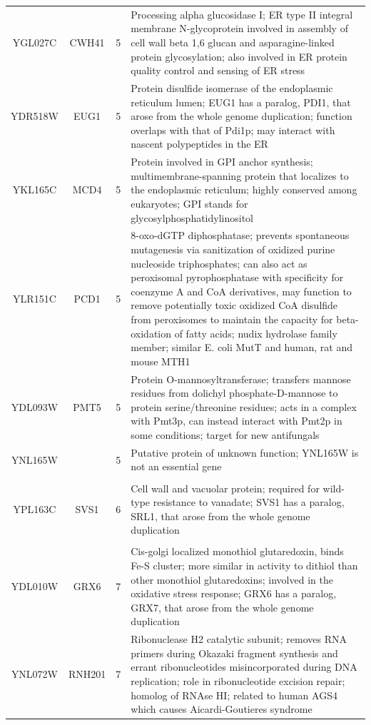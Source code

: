 \documentclass[]{article}
\begin{document}
\begin{longtable}{@{\extracolsep{3pt}} cccp{85mm}}
		YGL027C & CWH41 & 5 & Processing alpha glucosidase I; ER type II integral membrane N-glycoprotein involved in assembly of cell wall beta 1,6 glucan and asparagine-linked protein glycosylation; also involved in ER protein quality control and sensing of ER stress \\ 
		YDR518W & EUG1 & 5 & Protein disulfide isomerase of the endoplasmic reticulum lumen; EUG1 has a paralog, PDI1, that arose from the whole genome duplication; function overlaps with that of Pdi1p; may interact with nascent polypeptides in the ER \\ 
		YKL165C & MCD4 & 5 & Protein involved in GPI anchor synthesis; multimembrane-spanning protein that localizes to the endoplasmic reticulum; highly conserved among eukaryotes; GPI stands for glycosylphosphatidylinositol \\ 
		YLR151C & PCD1 & 5 & 8-oxo-dGTP diphosphatase; prevents spontaneous mutagenesis via sanitization of oxidized purine nucleoside triphosphates; can also act as peroxisomal pyrophosphatase with specificity for coenzyme A and CoA derivatives, may function to remove potentially toxic oxidized CoA disulfide from peroxisomes to maintain the capacity for beta-oxidation of fatty acids; nudix hydrolase family member; similar E. coli MutT and human, rat and mouse MTH1 \\ 
		YDL093W & PMT5 & 5 & Protein O-mannosyltransferase; transfers mannose residues from dolichyl phosphate-D-mannose to protein serine/threonine residues; acts in a complex with Pmt3p, can instead interact with Pmt2p in some conditions; target for new antifungals \\ 
		YNL165W &  & 5 & Putative protein of unknown function; YNL165W is not an essential gene \\ \hline \\[-1.8ex]
		YPL163C & SVS1 & 6 & Cell wall and vacuolar protein; required for wild-type resistance to vanadate; SVS1 has a paralog, SRL1, that arose from the whole genome duplication \\ \hline \\[-1.8ex]
		YDL010W & GRX6 & 7 & Cis-golgi localized monothiol glutaredoxin, binds Fe-S cluster; more similar in activity to dithiol than other monothiol glutaredoxins; involved in the oxidative stress response; GRX6 has a paralog, GRX7, that arose from the whole genome duplication \\ 
		YNL072W & RNH201 & 7 & Ribonuclease H2 catalytic subunit; removes RNA primers during Okazaki fragment synthesis and errant ribonucleotides misincorporated during DNA replication; role in ribonucleotide excision repair; homolog of RNAse HI; related to human AGS4 which causes Aicardi-Goutieres syndrome \\ 

\end{longtable}
\end{document}
